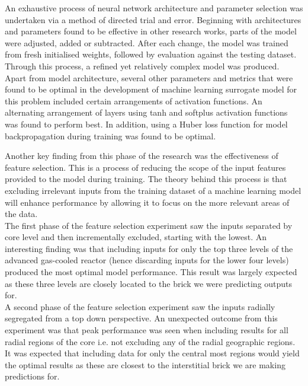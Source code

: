  \noindent 
 An exhaustive process of neural network architecture and parameter selection was undertaken via a method of directed trial and error. Beginning with architectures and parameters found to be effective in other research works, parts of the model were adjusted, added or subtracted. After each change, the model was trained from fresh initialised weights, followed by evaluation against the testing dataset. Through this process, a refined yet relatively complex model was produced. \\
   
 \noindent
 Apart from model architecture, several other parameters and metrics that were found to be optimal in the development of machine learning surrogate model for this problem included certain arrangements of activation functions. An alternating arrangement of layers using tanh and softplus activation functions was found to perform best. In addition, using a Huber loss function for model backpropagation during training was found to be optimal.  
 
 \noindent
 Another key finding from this phase of the research was the effectiveness of feature selection. This is a process of reducing the scope of the input features provided to the model during training. The theory behind this process is that excluding  irrelevant inputs from the training dataset of a machine learning model will enhance performance by allowing it to focus on the more relevant areas of the data.\\
 
 \noindent
 The first phase of the feature selection experiment saw the inputs separated by core level and then incrementally excluded, starting with the lowest. An interesting finding was that including inputs for only the top three levels of the advanced gas-cooled reactor (hence discarding inputs for the lower four levels)  produced the most optimal model performance. This result was largely expected as these three levels are closely located to the brick we were predicting outputs for. \\
 
 \noindent A second phase of the feature selection experiment saw the inputs radially segregated from a top down perspective. An unexpected outcome from this experiment was that peak performance was seen when including results for all radial regions of the core i.e. not excluding any of the radial geographic regions. It was expected that including data for only the central most regions would yield the optimal results as these are closest to the interstitial brick we are making predictions for. \\
 
